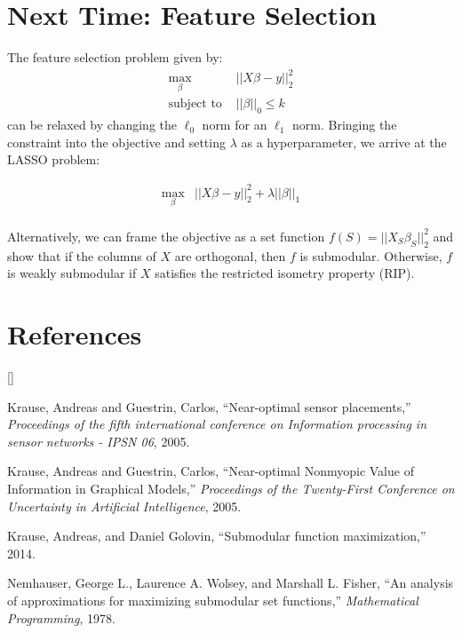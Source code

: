 \documentclass[twoside]{article}
\def\beginrefs{\begin{list}%
        {[\arabic{equation}]}{\usecounter{equation}
         \setlength{\leftmargin}{2.0truecm}\setlength{\labelsep}{0.4truecm}%
         \setlength{\labelwidth}{1.6truecm}}}
\def\endrefs{\end{list}}
\def\bibentry#1{\item[\hbox{[#1]}]}
\theoremstyle{definition}
\begin{document}
\newpage

\section{Next Time: Feature Selection}

The feature selection problem given by:
\begin{equation*}
  \begin{split}
    \max_{\beta} &||X\beta - y||_2^2\\
    \text{subject to } & ||\beta||_0 \leq k
  \end{split}
\end{equation*}
can be relaxed by changing the $\ell_0$ norm for an $\ell_1$
norm. Bringing the constraint into the objective and setting $\lambda$
as a hyperparameter, we arrive at the LASSO problem:

\begin{equation*}
  \begin{split}
    \max_{\beta} &||X\beta - y||_2^2 + \lambda ||\beta||_1\\
  \end{split}
\end{equation*}

Alternatively, we can frame the objective as a set function
$f(S) = ||X_S\beta_S||_2^2$ and show that if the columns of $X$ are
orthogonal, then $f$ is submodular. Otherwise, $f$ is weakly submodular
if $X$ satisfies the restricted isometry property (RIP).

\newpage
\section*{References}
\beginrefs
\bibentry{KG05-1}{\sc Krause, Andreas and Guestrin, Carlos},
``Near-optimal sensor placements,''
{\it Proceedings of the fifth international conference on Information
  processing in sensor networks - IPSN 06}, 2005.

\bibentry{KG05-2}{\sc Krause, Andreas and Guestrin, Carlos},
``Near-optimal Nonmyopic Value of Information in Graphical Models,''
{\it Proceedings of the Twenty-First Conference on Uncertainty in
  Artificial Intelligence}, 2005.

\bibentry{KG14}{\sc Krause, Andreas, and Daniel Golovin},
``Submodular function maximization,'' 2014.

\bibentry{NW78}{\sc Nemhauser, George L., Laurence A. Wolsey, and Marshall L. Fisher},
``An analysis of approximations for maximizing submodular set functions,''
{\it Mathematical Programming}, 1978.
\endrefs

\end{document}
